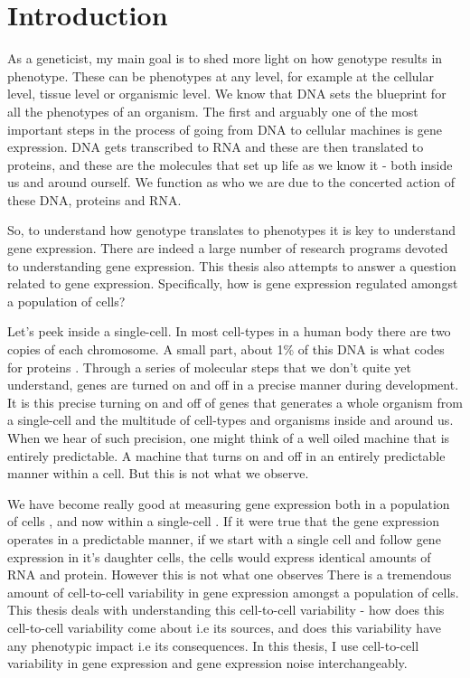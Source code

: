 \chapter{Introduction}
\label{chap:introduction}
\tightlists

As a geneticist, my main goal is to shed more light on how genotype results in phenotype. These can be phenotypes at any level, for example at the cellular level, tissue level or organismic level. We know that DNA sets the blueprint for all the phenotypes of an organism. The first and arguably one of the most important steps in the process of going from DNA to cellular machines is gene expression. DNA gets transcribed to RNA and these are then translated to proteins, and these are the molecules that set up life as we know it - both inside us and around ourself. We function as who we are due to the concerted action of these DNA, proteins and RNA.

So, to understand how genotype translates to phenotypes it is key to understand gene expression. There are indeed a large number of research programs devoted to understanding gene expression. This thesis also attempts to answer a question related to gene expression. Specifically, how is gene expression regulated amongst a population of cells?

Let's peek inside a single-cell. In most cell-types in a human body there are two copies of each chromosome. A small part, about 1\% of this DNA is what codes for proteins \cite {human genome}. Through a series of molecular steps that we don't quite yet understand, genes are turned on and off in a precise manner during development. It is this precise turning on and off of genes that generates a whole organism from a single-cell and the multitude of cell-types and organisms inside and around us. When we hear of such precision, one might think of a well oiled machine that is entirely predictable. A machine that turns on and off in an entirely predictable manner within a cell. But this is not what we observe.

We have become really good at measuring gene expression both in a population of cells \cite{bulk rnaseq, }, and now within a single-cell \cite{single-cell, flow cityu, smFish}. If it were true that the gene expression operates in a predictable manner, if we start with a single cell and follow gene expression in it's daughter cells, the cells would express identical amounts of RNA and protein. However this is not what one observes \cite{elowitz} There is a tremendous amount of cell-to-cell variability in gene expression amongst a population of cells. This thesis deals with understanding this cell-to-cell variability - how does this cell-to-cell variability come about i.e its sources, and does this variability have any phenotypic impact i.e its consequences. In this thesis, I use cell-to-cell variability in gene expression and gene expression noise interchangeably.

